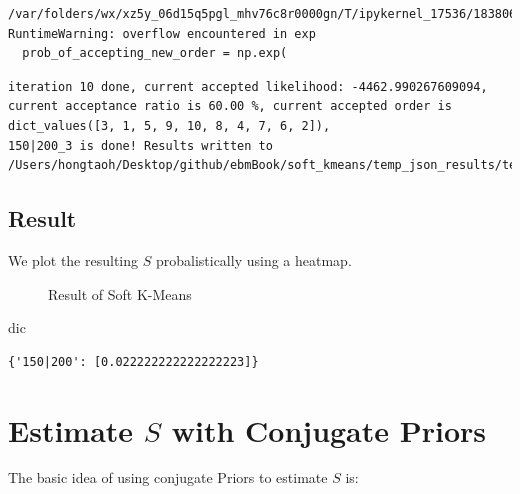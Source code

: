 \documentclass[
  letterpaper,
  DIV=11,
  numbers=noendperiod]{scrreprt}
\newenvironment{Shaded}{\begin{snugshade}}{\end{snugshade}}
\newcommand{\NormalTok}[1]{\textcolor[rgb]{0.00,0.23,0.31}{#1}}
\begin{document}
\begin{verbatim}
/var/folders/wx/xz5y_06d15q5pgl_mhv76c8r0000gn/T/ipykernel_17536/1838063648.py:260: RuntimeWarning: overflow encountered in exp
  prob_of_accepting_new_order = np.exp(
\end{verbatim}

\begin{verbatim}
iteration 10 done, current accepted likelihood: -4462.990267609094, current acceptance ratio is 60.00 %, current accepted order is dict_values([3, 1, 5, 9, 10, 8, 4, 7, 6, 2]), 
150|200_3 is done! Results written to /Users/hongtaoh/Desktop/github/ebmBook/soft_kmeans/temp_json_results/temp_results_200_0.75_3.json
\end{verbatim}

\section{Result}\label{result-2}

We plot the resulting \(S\) probalistically using a heatmap.

\begin{figure}


\caption{\label{fig-soft-kmeans-result}Result of Soft K-Means}

\end{figure}%

\begin{Shaded}
\begin{Highlighting}[]
\NormalTok{dic}
\end{Highlighting}
\end{Shaded}

\begin{verbatim}
{'150|200': [0.022222222222222223]}
\end{verbatim}


\chapter{\texorpdfstring{Estimate \(S\) with Conjugate
Priors}{Estimate S with Conjugate Priors}}\label{sec-estS-conjugate-priors}

The basic idea of using conjugate Priors to estimate \(S\) is:
\end{document}
